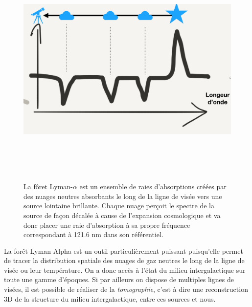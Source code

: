 \begin{figure}[htbp]
	\centering
		\includegraphics[height=12cm]{figs/lya.png}
		\caption[Principe de la forêt Lyman-$\alpha$]{La fôret Lyman-$\alpha$ est un ensemble de raies d'absorptions créées par des nuages neutres absorbants le long de la ligne de visée vers une source lointaine brillante. Chaque nuage perçoit le spectre de la source de façon décalée à cause de l'expansion cosmologique et va donc placer une raie d'absorption à sa propre fréquence correspondant à 121.6 nm dans son référentiel.}
	\label{f:lya}
\end{figure}

La forêt Lyman-Alpha est un outil particulièrement puissant puisqu'elle permet de tracer la distribution spatiale des nuages de gaz neutres le long de la ligne de visée ou leur température. On a donc accès à l'état du milieu intergalactique sur toute une gamme d'époques. Si par ailleurs on dispose de multiples lignes de visées, il est possible de réaliser de la \textit{tomographie}, c'est à dire une reconstruction 3D de la structure du milieu intergalactique, entre ces sources et nous.

